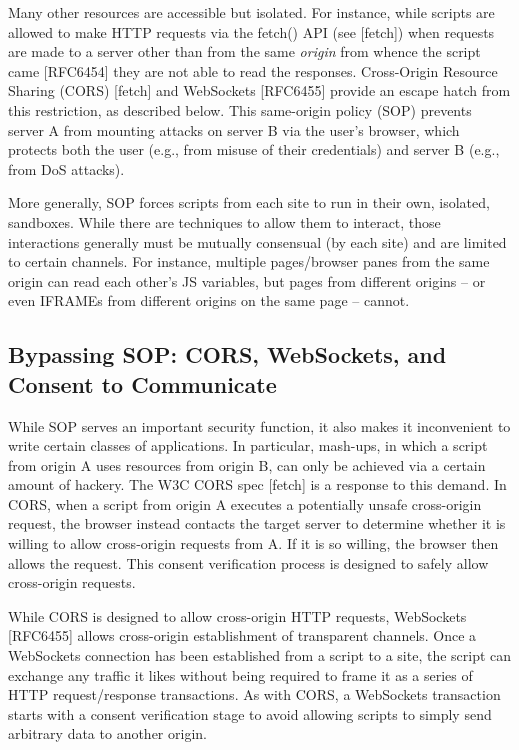 \documentclass{article}
\begin{document}
Many other resources are accessible but isolated.  For instance,
while scripts are allowed to make HTTP requests via the fetch() API
(see [fetch]) when requests are made to a server other than from the
same \emph{origin} from whence the script came [RFC6454] they are not able
to read the responses.  Cross-Origin Resource Sharing (CORS) [fetch]
and WebSockets [RFC6455] provide an escape hatch from this
restriction, as described below.  This same-origin policy (SOP)
prevents server A from mounting attacks on server B via the user's
browser, which protects both the user (e.g., from misuse of their
credentials) and server B (e.g., from DoS attacks).

More generally, SOP forces scripts from each site to run in their
own, isolated, sandboxes.  While there are techniques to allow them
to interact, those interactions generally must be mutually consensual
(by each site) and are limited to certain channels.  For instance,
multiple pages/browser panes from the same origin can read each
other's JS variables, but pages from different origins -- or even
IFRAMEs from different origins on the same page -- cannot.

\subsection{Bypassing SOP: CORS, WebSockets, and Consent to Communicate}

While SOP serves an important security function, it also makes it
inconvenient to write certain classes of applications.  In
particular, mash-ups, in which a script from origin A uses resources
from origin B, can only be achieved via a certain amount of hackery.
The W3C CORS spec [fetch] is a response to this demand.  In CORS,
when a script from origin A executes a potentially unsafe cross-origin
request, the browser instead contacts the target server to
determine whether it is willing to allow cross-origin requests from
A.  If it is so willing, the browser then allows the request.  This
consent verification process is designed to safely allow cross-origin
requests.

While CORS is designed to allow cross-origin HTTP requests,
WebSockets [RFC6455] allows cross-origin establishment of transparent
channels.  Once a WebSockets connection has been established from a
script to a site, the script can exchange any traffic it likes
without being required to frame it as a series of HTTP request/response
transactions.  As with CORS, a WebSockets transaction starts
with a consent verification stage to avoid allowing scripts to simply
send arbitrary data to another origin.
\end{document}
